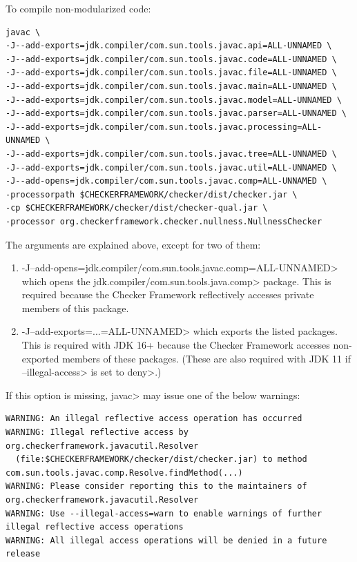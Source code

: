 
To compile non-modularized code:

\begin{Verbatim}
javac \
-J--add-exports=jdk.compiler/com.sun.tools.javac.api=ALL-UNNAMED \
-J--add-exports=jdk.compiler/com.sun.tools.javac.code=ALL-UNNAMED \
-J--add-exports=jdk.compiler/com.sun.tools.javac.file=ALL-UNNAMED \
-J--add-exports=jdk.compiler/com.sun.tools.javac.main=ALL-UNNAMED \
-J--add-exports=jdk.compiler/com.sun.tools.javac.model=ALL-UNNAMED \
-J--add-exports=jdk.compiler/com.sun.tools.javac.parser=ALL-UNNAMED \
-J--add-exports=jdk.compiler/com.sun.tools.javac.processing=ALL-UNNAMED \
-J--add-exports=jdk.compiler/com.sun.tools.javac.tree=ALL-UNNAMED \
-J--add-exports=jdk.compiler/com.sun.tools.javac.util=ALL-UNNAMED \
-J--add-opens=jdk.compiler/com.sun.tools.javac.comp=ALL-UNNAMED \
-processorpath $CHECKERFRAMEWORK/checker/dist/checker.jar \
-cp $CHECKERFRAMEWORK/checker/dist/checker-qual.jar \
-processor org.checkerframework.checker.nullness.NullnessChecker
\end{Verbatim}

The arguments are explained above, except for two of them:
\begin{enumerate}

\item \<-J--add-opens=jdk.compiler/com.sun.tools.javac.comp=ALL-UNNAMED> which
opens the \<jdk.compiler/com.sun.tools.java.comp> package.  This is
required because the Checker Framework reflectively accesses private members of this package.

\item \<-J--add-exports=...=ALL-UNNAMED> which exports the listed packages.  This is
required with JDK 16+ because the Checker Framework accesses non-exported members of these packages.
(These are also required with JDK 11 if \<--illegal-access> is set to \<deny>.)

\end{enumerate}

If this option is missing, \<javac> may issue one of the below warnings:
\begin{Verbatim}
WARNING: An illegal reflective access operation has occurred
WARNING: Illegal reflective access by org.checkerframework.javacutil.Resolver
  (file:$CHECKERFRAMEWORK/checker/dist/checker.jar) to method com.sun.tools.javac.comp.Resolve.findMethod(...)
WARNING: Please consider reporting this to the maintainers of org.checkerframework.javacutil.Resolver
WARNING: Use --illegal-access=warn to enable warnings of further illegal reflective access operations
WARNING: All illegal access operations will be denied in a future release
\end{Verbatim}

